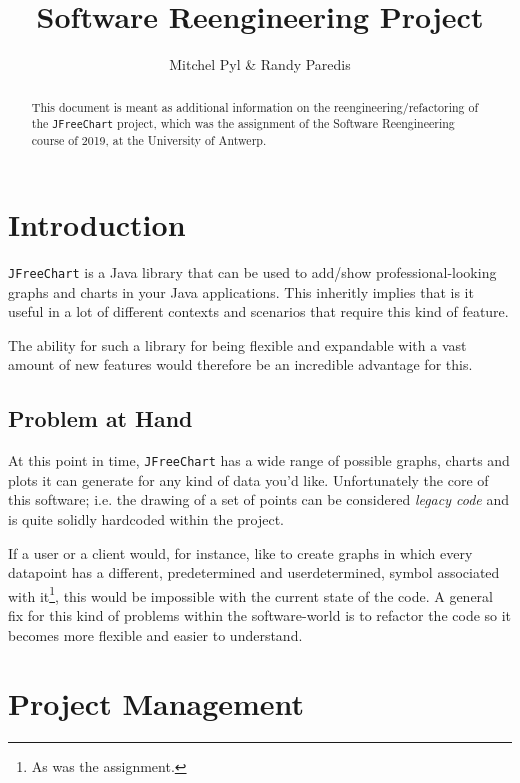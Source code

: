 \documentclass[11pt]{article}
\begin{document}
	\title{Software Reengineering Project}
	\author{Mitchel Pyl \& Randy Paredis}
	\date{}
	
	\maketitle
	
	\begin{abstract}
		This document is meant as additional information on the reengineering/refactoring of the \texttt{JFreeChart} project, which was the assignment of the \textsf{Software Reengineering} course of 2019, at the \textsf{University of Antwerp}.
	\end{abstract}
	
	\section{Introduction}
	\texttt{JFreeChart} is a Java library that can be used to add/show professional-looking graphs and charts in your Java applications. This inheritly implies that is it useful in a lot of different contexts and scenarios that require this kind of feature.
	
	The ability for such a library for being flexible and expandable with a vast amount of new features would therefore be an incredible advantage for this.
	
	\subsection{Problem at Hand}
	At this point in time, \texttt{JFreeChart} has a wide range of possible graphs, charts and plots it can generate for any kind of data you'd like. Unfortunately the core of this software; i.e. the drawing of a set of points can be considered \textit{legacy code} and is quite solidly hardcoded within the project.
	
	If a user or a client would, for instance, like to create graphs in which every datapoint has a different, predetermined and userdetermined, symbol associated with it\footnote{As was the assignment.}, this would be impossible with the current state of the code. A general fix for this kind of problems within the software-world is to refactor the code so it becomes more flexible and easier to understand.
	
	\section{Project Management}
	
\end{document}
